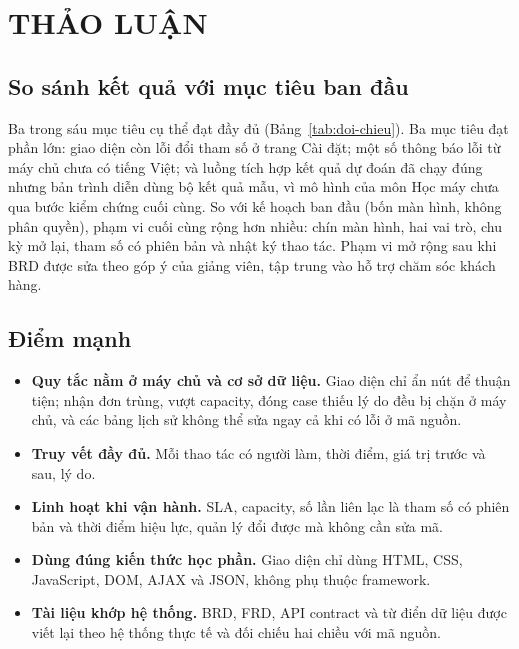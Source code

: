 
\section{THẢO LUẬN}

\subsection{So sánh kết quả với mục tiêu ban đầu}

Ba trong sáu mục tiêu cụ thể đạt đầy đủ (Bảng~\ref{tab:doi-chieu}). Ba mục tiêu đạt phần lớn: giao diện
còn lỗi đổi tham số ở trang Cài đặt; một số thông báo lỗi từ máy chủ chưa có tiếng Việt; và luồng tích
hợp kết quả dự đoán đã chạy đúng nhưng bản trình diễn dùng bộ kết quả mẫu, vì mô hình của môn Học máy
chưa qua bước kiểm chứng cuối cùng. So với kế hoạch ban đầu (bốn màn hình, không phân quyền), phạm vi cuối cùng rộng hơn
nhiều: chín màn hình, hai vai trò, chu kỳ mở lại, tham số có phiên bản và nhật ký thao tác. Phạm vi
mở rộng sau khi BRD được sửa theo góp ý của giảng viên, tập trung vào hỗ trợ chăm sóc khách hàng.

\subsection{Điểm mạnh}

\begin{itemize}
    \item \textbf{Quy tắc nằm ở máy chủ và cơ sở dữ liệu.} Giao diện chỉ ẩn nút để thuận tiện; nhận
    đơn trùng, vượt capacity, đóng case thiếu lý do đều bị chặn ở máy chủ, và các bảng lịch sử không
    thể sửa ngay cả khi có lỗi ở mã nguồn.
    \item \textbf{Truy vết đầy đủ.} Mỗi thao tác có người làm, thời điểm, giá trị trước và sau, lý do.
    \item \textbf{Linh hoạt khi vận hành.} SLA, capacity, số lần liên lạc là tham số có phiên bản và
    thời điểm hiệu lực, quản lý đổi được mà không cần sửa mã.
    \item \textbf{Dùng đúng kiến thức học phần.} Giao diện chỉ dùng HTML, CSS, JavaScript, DOM, AJAX
    và JSON, không phụ thuộc framework.
    \item \textbf{Tài liệu khớp hệ thống.} BRD, FRD, API contract và từ điển dữ liệu được viết lại theo
    hệ thống thực tế và đối chiếu hai chiều với mã nguồn.
\end{itemize}

